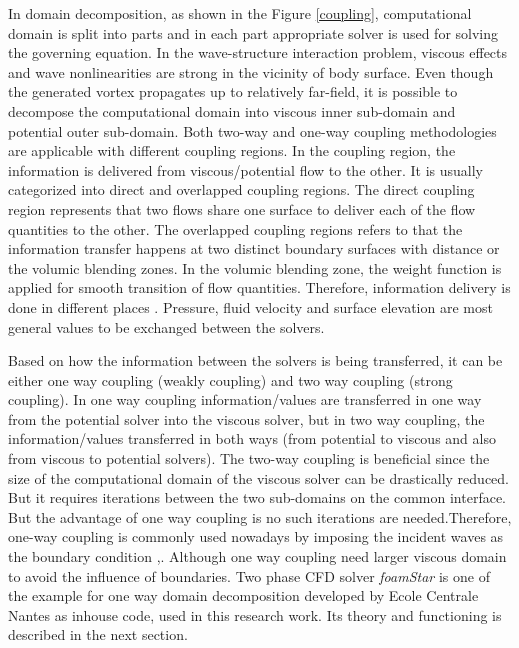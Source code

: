 \documentclass[preprint,12pt]{article}
\begin{document}
{In domain decomposition, as shown in the Figure \ref{coupling}, computational domain is split into parts and in each part appropriate solver is used for solving the governing equation. In the wave-structure interaction problem, viscous effects and wave nonlinearities are strong in the vicinity of body surface. Even though the generated vortex propagates up to relatively far-field, it is possible to decompose the computational domain into viscous inner sub-domain and potential outer sub-domain. Both two-way and one-way coupling methodologies are applicable with different coupling regions. In the coupling region, the information is delivered from viscous/potential flow to the other. It is usually categorized into direct and overlapped coupling regions. The direct coupling region represents that two flows share one surface to deliver each of the flow quantities to the other\cite{Paulsen2014}. The overlapped coupling regions refers to that the information transfer happens at two distinct boundary surfaces with distance or the volumic blending zones. In the volumic blending zone, the weight function is applied for smooth transition of flow quantities. Therefore, information delivery is done in different places \cite{Vandebeek2018}. Pressure, fluid velocity and surface elevation are most general values to be exchanged between the solvers. \par
Based on how the information between the solvers is being transferred, it can be either one way coupling (weakly coupling) and two way coupling (strong coupling). In one way coupling information/values are transferred in one way from the potential solver into the viscous solver, but in two way coupling, the information/values transferred in both ways (from potential to viscous and also from viscous to potential solvers). The two-way coupling is beneficial since the size of the computational domain of the viscous solver can be drastically reduced. But it requires iterations between the two sub-domains on the common interface. But the advantage of one way coupling is no such iterations are needed.Therefore, one-way coupling is commonly used nowadays by imposing the incident waves as the boundary condition \cite{Jacobsen2012},\cite{Paulsen2014}. Although one way coupling need larger viscous domain to avoid the influence of boundaries. Two phase CFD solver \textit{foamStar} is one of the example for one way domain decomposition developed by Ecole Centrale Nantes as inhouse code, used in this research work. Its theory and functioning is described in the next section. 
 

}
\end{document}
